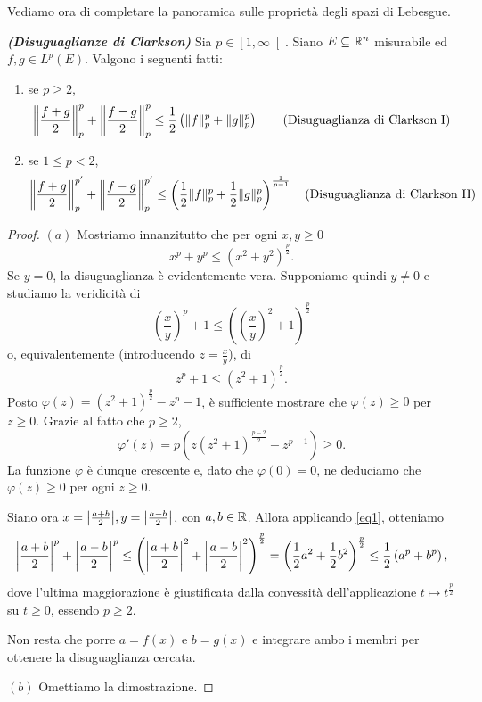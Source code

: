Vediamo ora di completare la panoramica sulle proprietà degli spazi di Lebesgue.
\begin{teorema}\emph{\textbf{(Disuguaglianze di Clarkson)}} Sia $p \in \left[ 1, \infty\right[ $. Siano $E \subseteq \R^{n} $ misurabile ed $f,g \in L^{p}(E)$. Valgono i seguenti fatti:
	\begin{enumerate}[$(a)$]
		\item se $p \ge 2$, 
		\[ \norm*{\frac{f+g}{2}}^{p}_{p} + \norm*{\frac{f-g}{2}}^{p}_{p} \le \frac{1}{2}\left( \norm{f}^{p}_{p} +  \norm{g}^{p}_{p}\right) \qquad \textup{(Disuguaglianza di Clarkson I)}\]
		\item se $1 \le p < 2$, 
		\[ \norm*{\frac{f+g}{2}}^{p'}_{p} + \norm*{\frac{f-g}{2}}^{p'}_{p} \le \left( \frac{1}{2}\norm{f}^{p}_{p} +  \frac{1}{2}\norm{g}^{p}_{p}\right)^{\frac{1}{p-1}} \quad \textup{(Disuguaglianza di Clarkson II)}\]
	\end{enumerate}
\end{teorema}
\begin{proof} \hfill
	\par\noindent
	$(a)$ Mostriamo innanzitutto che per ogni $ x,y \ge 0$
	\begin{equation}\label{eq1}
		x^{p} + y^{p} \le (x^{2} + y^2)^{\frac{p}{2}}.
	\end{equation} 
		Se $y = 0$, la disuguaglianza è evidentemente vera. Supponiamo quindi $y \ne 0$ e studiamo la veridicità di 
	\[ \left(\frac{x}{y}\right)^p + 1 \le \left( \left( \frac{x}{y}\right) ^2 + 1\right) ^{\frac{p}{2}}  \]
	o, equivalentemente (introducendo $z = \frac{x}{y}$), di 
	\[ z^p +1 \le (z^2 + 1)^{\frac{p}{2}}. \]
	Posto $\varphi(z) = (z^2 + 1)^{\frac{p}{2}} - z^p - 1 $, è sufficiente mostrare che $\varphi(z) \ge 0$ per $z \ge 0$. Grazie al fatto che $p \ge 2$, 
	\[ \varphi'(z) = p\left( z(z^2 + 1)^{\frac{p-2}{2}} - z^{p-1}\right) \ge 0. \]
	La funzione $\varphi$ è dunque crescente e, dato che $\varphi(0) = 0$, ne deduciamo che $\varphi(z) \ge 0$ per ogni $z \ge 0$.
	
	Siano ora $x = \abs*{\frac{a+b}{2}}, y = \abs*{\frac{a-b}{2}}$, con $a,b \in \R$. Allora applicando \eqref{eq1}, otteniamo 
	\[ \abs*{\frac{a+b}{2}}^{p} + \abs*{\frac{a-b}{2}}^{p} \le \left( \abs*{\frac{a+b}{2}}^{2} + \abs*{\frac{a-b}{2}}^2\right) ^{\frac{p}{2}} = \left( \frac{1}{2}a^{2} + \frac{1}{2}b^{2}\right)^{\frac{p}{2}}\le \frac{1}{2} \left( a^{p} + b^{p}\right), \]
	dove l'ultima maggiorazione è giustificata dalla convessità dell'applicazione $t \mapsto t^{\frac{p}{2}}$ su $t\ge 0$, essendo $p\ge2$.
	
	Non resta che porre $a = f(x)$ e $b= g(x)$ e integrare ambo i membri per ottenere la disuguaglianza cercata.
	\par\noindent
	$(b)$ Omettiamo la dimostrazione.\qedhere
\end{proof}
